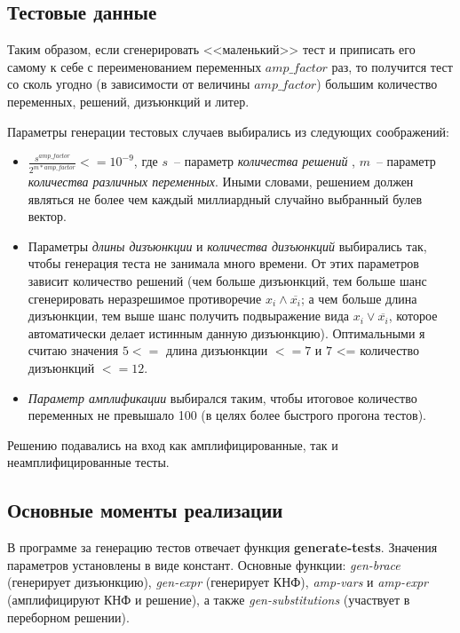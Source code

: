 \documentclass[12pt]{article}
\begin{document}
    \subsection{Тестовые данные}
    Таким образом, если сгенерировать <<маленький>> тест и приписать его самому к себе с переименованием переменных $amp\_factor$ раз, то получится тест со сколь угодно (в зависимости
    от величины $amp\_factor$) большим количество переменных, решений, дизъюнкций и литер.

    Параметры генерации тестовых случаев выбирались из следующих соображений:
    \begin{itemize}
        \item $\frac{s^{amp\_factor}}{2^{m * amp\_factor}} <= 10^{-9}$, где $s$~-- параметр \textit{количества решений}
            , $m$~-- параметр \textit{количества различных переменных}. Иными словами,
            решением должен являться не более чем каждый миллиардный случайно выбранный булев вектор.
        \item Параметры \textit{длины дизъюнкции} и \textit{количества дизъюнкций}
            выбирались так, чтобы генерация теста не занимала много времени. От этих параметров зависит количество решений (чем
            больше дизъюнкций, тем больше шанс сгенерировать неразрешимое противоречие $x_i \land \overline{x_i}$; а чем больше длина дизъюнкции, тем выше шанс получить
            подвыражение вида $x_i \lor \overline{x_i}$, которое автоматически делает истинным данную дизъюнкцию). Оптимальными я считаю
            значения $5 <=$ длина дизъюнкции $<= 7$ и $7 $ <= количество
            дизъюнкций $ <= 12$.
        \item \textit{Параметр амплификации} выбирался таким, чтобы итоговое количество переменных не превышало 100 (в целях более быстрого прогона тестов).
    \end{itemize}

    Решению подавались на вход как амплифицированные, так и неамплифицированные тесты.

    \subsection{Основные моменты реализации}

    В программе за генерацию тестов отвечает функция \textbf{generate-tests}. Значения параметров установлены в виде констант. Основные функции: \textit{gen-brace}
    (генерирует дизъюнкцию), \textit{gen-expr} (генерирует КНФ), \textit{amp-vars} и \textit{amp-expr} (амплифицируют КНФ и решение), а также \textit{gen-substitutions}
    (участвует в переборном решении). 
    
\end{document}
